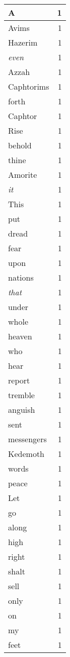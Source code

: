\begin{center}
\begin{longtable}{l|r}
A & 1 \\ \hline
Avims & 1 \\ \hline
Hazerim & 1 \\ \hline
\emph{even} & 1 \\ \hline
Azzah & 1 \\ \hline
Caphtorims & 1 \\ \hline
forth & 1 \\ \hline
Caphtor & 1 \\ \hline
Rise & 1 \\ \hline
behold & 1 \\ \hline
thine & 1 \\ \hline
Amorite & 1 \\ \hline
\emph{it} & 1 \\ \hline
This & 1 \\ \hline
put & 1 \\ \hline
dread & 1 \\ \hline
fear & 1 \\ \hline
upon & 1 \\ \hline
nations & 1 \\ \hline
\emph{that} & 1 \\ \hline
under & 1 \\ \hline
whole & 1 \\ \hline
heaven & 1 \\ \hline
who & 1 \\ \hline
hear & 1 \\ \hline
report & 1 \\ \hline
tremble & 1 \\ \hline
anguish & 1 \\ \hline
sent & 1 \\ \hline
messengers & 1 \\ \hline
Kedemoth & 1 \\ \hline
words & 1 \\ \hline
peace & 1 \\ \hline
Let & 1 \\ \hline
go & 1 \\ \hline
along & 1 \\ \hline
high & 1 \\ \hline
right & 1 \\ \hline
shalt & 1 \\ \hline
sell & 1 \\ \hline
only & 1 \\ \hline
on & 1 \\ \hline
my & 1 \\ \hline
feet & 1 \\ \hline

\end{longtable}
\end{center}
